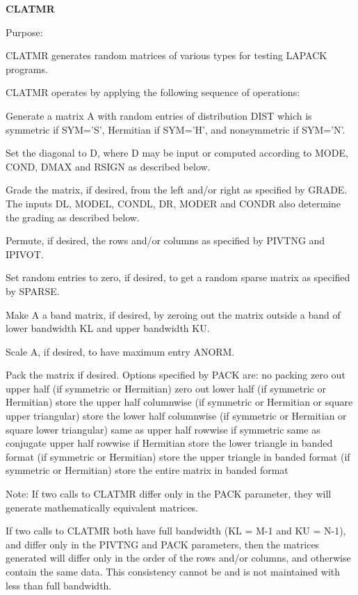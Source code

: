 {\bfseries C\+L\+A\+T\+M\+R} 

\begin{DoxyParagraph}{Purpose\+: }
\begin{DoxyVerb}    CLATMR generates random matrices of various types for testing
    LAPACK programs.

    CLATMR operates by applying the following sequence of
    operations:

      Generate a matrix A with random entries of distribution DIST
         which is symmetric if SYM='S', Hermitian if SYM='H', and
         nonsymmetric if SYM='N'.

      Set the diagonal to D, where D may be input or
         computed according to MODE, COND, DMAX and RSIGN
         as described below.

      Grade the matrix, if desired, from the left and/or right
         as specified by GRADE. The inputs DL, MODEL, CONDL, DR,
         MODER and CONDR also determine the grading as described
         below.

      Permute, if desired, the rows and/or columns as specified by
         PIVTNG and IPIVOT.

      Set random entries to zero, if desired, to get a random sparse
         matrix as specified by SPARSE.

      Make A a band matrix, if desired, by zeroing out the matrix
         outside a band of lower bandwidth KL and upper bandwidth KU.

      Scale A, if desired, to have maximum entry ANORM.

      Pack the matrix if desired. Options specified by PACK are:
         no packing
         zero out upper half (if symmetric or Hermitian)
         zero out lower half (if symmetric or Hermitian)
         store the upper half columnwise (if symmetric or Hermitian
             or square upper triangular)
         store the lower half columnwise (if symmetric or Hermitian
             or square lower triangular)
             same as upper half rowwise if symmetric
             same as conjugate upper half rowwise if Hermitian
         store the lower triangle in banded format
             (if symmetric or Hermitian)
         store the upper triangle in banded format
             (if symmetric or Hermitian)
         store the entire matrix in banded format

    Note: If two calls to CLATMR differ only in the PACK parameter,
          they will generate mathematically equivalent matrices.

          If two calls to CLATMR both have full bandwidth (KL = M-1
          and KU = N-1), and differ only in the PIVTNG and PACK
          parameters, then the matrices generated will differ only
          in the order of the rows and/or columns, and otherwise
          contain the same data. This consistency cannot be and
          is not maintained with less than full bandwidth.\end{DoxyVerb}
 
\end{DoxyParagraph}

